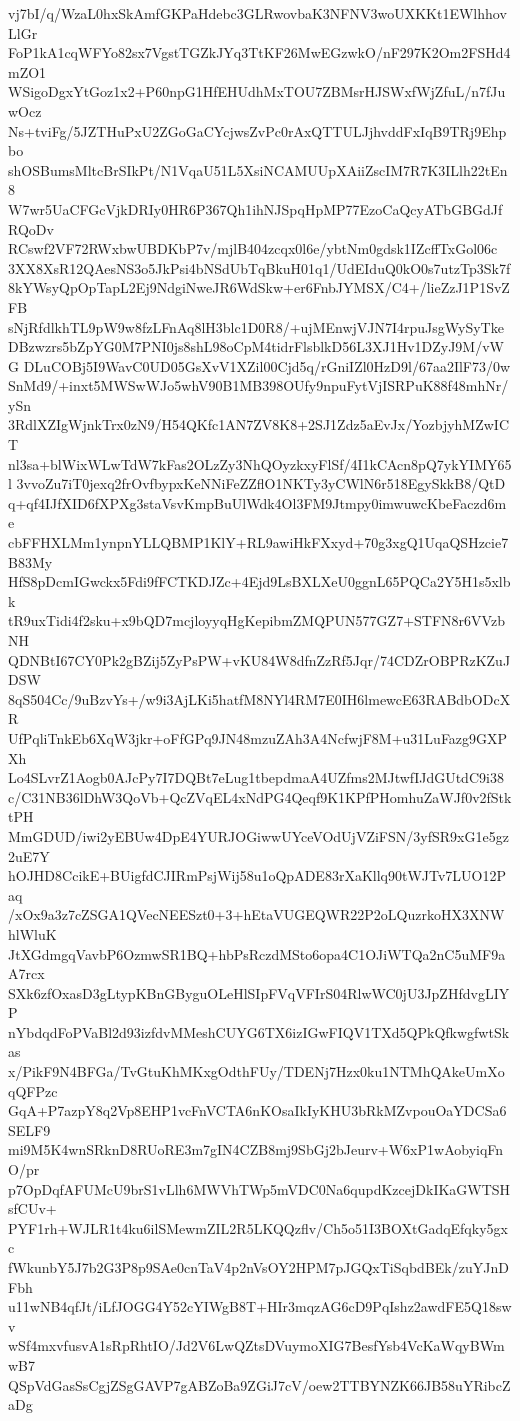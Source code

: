 vj7bI/q/WzaL0hxSkAmfGKPaHdebc3GLRwovbaK3NFNV3woUXKKt1EWlhhovLlGr
FoP1kA1cqWFYo82sx7VgstTGZkJYq3TtKF26MwEGzwkO/nF297K2Om2FSHd4mZO1
WSigoDgxYtGoz1x2+P60npG1HfEHUdhMxTOU7ZBMsrHJSWxfWjZfuL/n7fJuwOcz
Ns+tviFg/5JZTHuPxU2ZGoGaCYcjwsZvPc0rAxQTTULJjhvddFxIqB9TRj9Ehpbo
shOSBumsMltcBrSIkPt/N1VqaU51L5XsiNCAMUUpXAiiZscIM7R7K3ILlh22tEn8
W7wr5UaCFGcVjkDRIy0HR6P367Qh1ihNJSpqHpMP77EzoCaQcyATbGBGdJfRQoDv
RCswf2VF72RWxbwUBDKbP7v/mjlB404zcqx0l6e/ybtNm0gdsk1IZcffTxGol06c
3XX8XsR12QAesNS3o5JkPsi4bNSdUbTqBkuH01q1/UdEIduQ0kO0s7utzTp3Sk7f
8kYWsyQpOpTapL2Ej9NdgiNweJR6WdSkw+er6FnbJYMSX/C4+/lieZzJ1P1SvZFB
sNjRfdlkhTL9pW9w8fzLFnAq8lH3blc1D0R8/+ujMEnwjVJN7I4rpuJsgWySyTke
DBzwzrs5bZpYG0M7PNI0js8shL98oCpM4tidrFlsblkD56L3XJ1Hv1DZyJ9M/vWG
DLuCOBj5I9WavC0UD05GsXvV1XZil00Cjd5q/rGniIZl0HzD9l/67aa2IlF73/0w
SnMd9/+inxt5MWSwWJo5whV90B1MB398OUfy9npuFytVjISRPuK88f48mhNr/ySn
3RdlXZIgWjnkTrx0zN9/H54QKfc1AN7ZV8K8+2SJ1Zdz5aEvJx/YozbjyhMZwICT
nl3sa+blWixWLwTdW7kFas2OLzZy3NhQOyzkxyFlSf/4I1kCAcn8pQ7ykYIMY65l
3vvoZu7iT0jexq2frOvfbypxKeNNiFeZZflO1NKTy3yCWlN6r518EgySkkB8/QtD
q+qf4IJfXID6fXPXg3staVsvKmpBuUlWdk4Ol3FM9Jtmpy0imwuwcKbeFaczd6me
cbFFHXLMm1ynpnYLLQBMP1KlY+RL9awiHkFXxyd+70g3xgQ1UqaQSHzcie7B83My
HfS8pDcmIGwckx5Fdi9fFCTKDJZc+4Ejd9LsBXLXeU0ggnL65PQCa2Y5H1s5xlbk
tR9uxTidi4f2sku+x9bQD7mcjloyyqHgKepibmZMQPUN577GZ7+STFN8r6VVzbNH
QDNBtI67CY0Pk2gBZij5ZyPsPW+vKU84W8dfnZzRf5Jqr/74CDZrOBPRzKZuJDSW
8qS504Cc/9uBzvYs+/w9i3AjLKi5hatfM8NYl4RM7E0IH6lmewcE63RABdbODcXR
UfPqliTnkEb6XqW3jkr+oFfGPq9JN48mzuZAh3A4NcfwjF8M+u31LuFazg9GXPXh
Lo4SLvrZ1Aogb0AJcPy7I7DQBt7eLug1tbepdmaA4UZfms2MJtwfIJdGUtdC9i38
c/C31NB36lDhW3QoVb+QcZVqEL4xNdPG4Qeqf9K1KPfPHomhuZaWJf0v2fStktPH
MmGDUD/iwi2yEBUw4DpE4YURJOGiwwUYceVOdUjVZiFSN/3yfSR9xG1e5gz2uE7Y
hOJHD8CcikE+BUigfdCJIRmPsjWij58u1oQpADE83rXaKllq90tWJTv7LUO12Paq
/xOx9a3z7cZSGA1QVecNEESzt0+3+hEtaVUGEQWR22P2oLQuzrkoHX3XNWhlWluK
JtXGdmgqVavbP6OzmwSR1BQ+hbPsRczdMSto6opa4C1OJiWTQa2nC5uMF9aA7rcx
SXk6zfOxasD3gLtypKBnGByguOLeHlSIpFVqVFIrS04RlwWC0jU3JpZHfdvgLIYP
nYbdqdFoPVaBl2d93izfdvMMeshCUYG6TX6izIGwFIQV1TXd5QPkQfkwgfwtSkas
x/PikF9N4BFGa/TvGtuKhMKxgOdthFUy/TDENj7Hzx0ku1NTMhQAkeUmXoqQFPzc
GqA+P7azpY8q2Vp8EHP1vcFnVCTA6nKOsaIkIyKHU3bRkMZvpouOaYDCSa6SELF9
mi9M5K4wnSRknD8RUoRE3m7gIN4CZB8mj9SbGj2bJeurv+W6xP1wAobyiqFnO/pr
p7OpDqfAFUMcU9brS1vLlh6MWVhTWp5mVDC0Na6qupdKzcejDkIKaGWTSHsfCUv+
PYF1rh+WJLR1t4ku6ilSMewmZIL2R5LKQQzflv/Ch5o51I3BOXtGadqEfqky5gxc
fWkunbY5J7b2G3P8p9SAe0cnTaV4p2nVsOY2HPM7pJGQxTiSqbdBEk/zuYJnDFbh
u11wNB4qfJt/iLfJOGG4Y52cYIWgB8T+HIr3mqzAG6cD9PqIshz2awdFE5Q18swv
wSf4mxvfusvA1sRpRhtIO/Jd2V6LwQZtsDVuymoXIG7BesfYsb4VcKaWqyBWmwB7
QSpVdGasSsCgjZSgGAVP7gABZoBa9ZGiJ7cV/oew2TTBYNZK66JB58uYRibcZaDg
